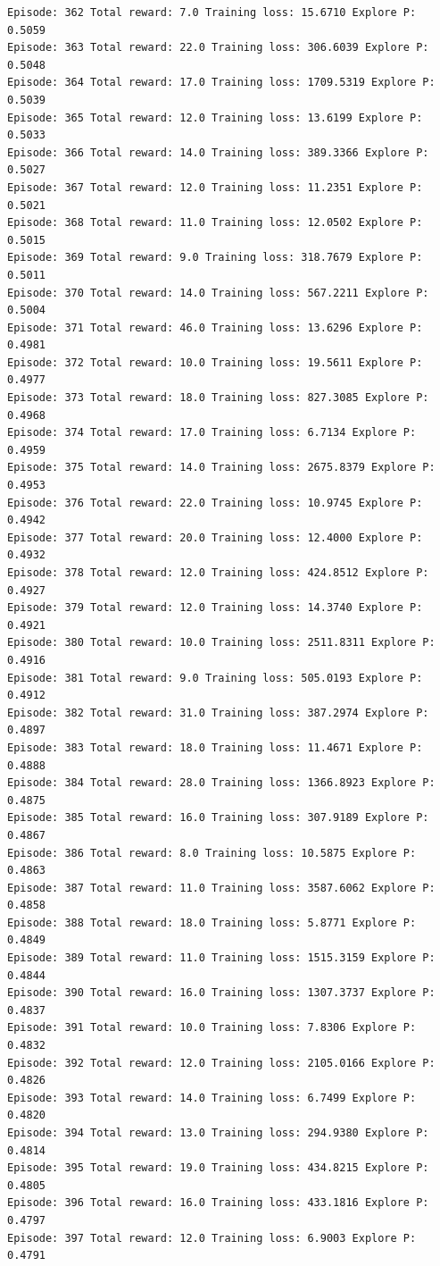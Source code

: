 \documentclass[11pt]{article}
\begin{document}
\begin{Verbatim}[commandchars=\\\{\}]
Episode: 362 Total reward: 7.0 Training loss: 15.6710 Explore P: 0.5059
Episode: 363 Total reward: 22.0 Training loss: 306.6039 Explore P: 0.5048
Episode: 364 Total reward: 17.0 Training loss: 1709.5319 Explore P: 0.5039
Episode: 365 Total reward: 12.0 Training loss: 13.6199 Explore P: 0.5033
Episode: 366 Total reward: 14.0 Training loss: 389.3366 Explore P: 0.5027
Episode: 367 Total reward: 12.0 Training loss: 11.2351 Explore P: 0.5021
Episode: 368 Total reward: 11.0 Training loss: 12.0502 Explore P: 0.5015
Episode: 369 Total reward: 9.0 Training loss: 318.7679 Explore P: 0.5011
Episode: 370 Total reward: 14.0 Training loss: 567.2211 Explore P: 0.5004
Episode: 371 Total reward: 46.0 Training loss: 13.6296 Explore P: 0.4981
Episode: 372 Total reward: 10.0 Training loss: 19.5611 Explore P: 0.4977
Episode: 373 Total reward: 18.0 Training loss: 827.3085 Explore P: 0.4968
Episode: 374 Total reward: 17.0 Training loss: 6.7134 Explore P: 0.4959
Episode: 375 Total reward: 14.0 Training loss: 2675.8379 Explore P: 0.4953
Episode: 376 Total reward: 22.0 Training loss: 10.9745 Explore P: 0.4942
Episode: 377 Total reward: 20.0 Training loss: 12.4000 Explore P: 0.4932
Episode: 378 Total reward: 12.0 Training loss: 424.8512 Explore P: 0.4927
Episode: 379 Total reward: 12.0 Training loss: 14.3740 Explore P: 0.4921
Episode: 380 Total reward: 10.0 Training loss: 2511.8311 Explore P: 0.4916
Episode: 381 Total reward: 9.0 Training loss: 505.0193 Explore P: 0.4912
Episode: 382 Total reward: 31.0 Training loss: 387.2974 Explore P: 0.4897
Episode: 383 Total reward: 18.0 Training loss: 11.4671 Explore P: 0.4888
Episode: 384 Total reward: 28.0 Training loss: 1366.8923 Explore P: 0.4875
Episode: 385 Total reward: 16.0 Training loss: 307.9189 Explore P: 0.4867
Episode: 386 Total reward: 8.0 Training loss: 10.5875 Explore P: 0.4863
Episode: 387 Total reward: 11.0 Training loss: 3587.6062 Explore P: 0.4858
Episode: 388 Total reward: 18.0 Training loss: 5.8771 Explore P: 0.4849
Episode: 389 Total reward: 11.0 Training loss: 1515.3159 Explore P: 0.4844
Episode: 390 Total reward: 16.0 Training loss: 1307.3737 Explore P: 0.4837
Episode: 391 Total reward: 10.0 Training loss: 7.8306 Explore P: 0.4832
Episode: 392 Total reward: 12.0 Training loss: 2105.0166 Explore P: 0.4826
Episode: 393 Total reward: 14.0 Training loss: 6.7499 Explore P: 0.4820
Episode: 394 Total reward: 13.0 Training loss: 294.9380 Explore P: 0.4814
Episode: 395 Total reward: 19.0 Training loss: 434.8215 Explore P: 0.4805
Episode: 396 Total reward: 16.0 Training loss: 433.1816 Explore P: 0.4797
Episode: 397 Total reward: 12.0 Training loss: 6.9003 Explore P: 0.4791

\end{Verbatim}
\end{document}
